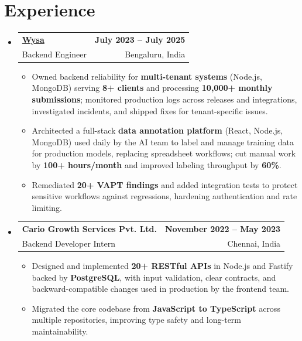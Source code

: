 \documentclass[letterpaper,10pt]{article}
\makeatletter
\newcommand{\resumeItem}[1]{
  \item\small{#1\vspace{-1pt}}
}
\newcommand{\resumeSubheading}[4]{
  \vspace{1pt}\item
    \begin{tabular*}{0.985\textwidth}[t]{l@{\extracolsep{\fill}}r}
      \textbf{#1} & \textbf{\small #2} \\
      {\small\color{ResumeSlate} #3} & {\small\color{ResumeSlate} #4} \\
    \end{tabular*}\vspace{-6pt}
}
\newcommand{\resumeSubHeadingListStart}{\begin{itemize}[leftmargin=0.0in, label={}, itemsep=2pt, topsep=2pt]}
\newcommand{\resumeSubHeadingListEnd}{\end{itemize}}
\newcommand{\resumeItemListStart}{\begin{itemize}[leftmargin=0.18in, itemsep=2pt, topsep=1pt]}
\newcommand{\resumeItemListEnd}{\end{itemize}\vspace{-4pt}}
\makeatother
\begin{document}
\section{Experience}
\resumeSubHeadingListStart
  \resumeSubheading
    {\href{https://www.wysa.io}{Wysa}}{July 2023 -- July 2025}
    {Backend Engineer}{Bengaluru, India}
    \resumeItemListStart
      \resumeItem{Owned backend reliability for \textbf{multi-tenant systems} (Node.js, MongoDB) serving \textbf{8+ clients} and processing \textbf{10{,}000+ monthly submissions}; monitored production logs across releases and integrations, investigated incidents, and shipped fixes for tenant-specific issues.}
      \resumeItem{Architected a full-stack \textbf{data annotation platform} (React, Node.js, MongoDB) used daily by the AI team to label and manage training data for production models, replacing spreadsheet workflows; cut manual work by \textbf{100+ hours/month} and improved labeling throughput by \textbf{60\%}.}
      \resumeItem{Remediated \textbf{20+ VAPT findings} and added integration tests to protect sensitive workflows against regressions, hardening authentication and rate limiting.}
    \resumeItemListEnd
  \resumeSubheading
    {Cario Growth Services Pvt. Ltd.}{November 2022 -- May 2023}
    {Backend Developer Intern}{Chennai, India}
    \resumeItemListStart
      \resumeItem{Designed and implemented \textbf{20+ RESTful APIs} in Node.js and Fastify backed by \textbf{PostgreSQL}, with input validation, clear contracts, and backward-compatible changes used in production by the frontend team.}
      \resumeItem{Migrated the core codebase from \textbf{JavaScript to TypeScript} across multiple repositories, improving type safety and long-term maintainability.}
    \resumeItemListEnd
\resumeSubHeadingListEnd
\vspace{-4pt}
\end{document}

